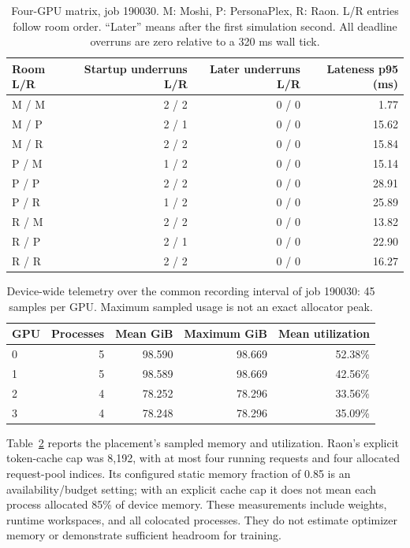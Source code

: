 \documentclass{article}
\begin{document}
\begin{table}[t]
\centering
\caption{Four-GPU matrix, job 190030. M: Moshi, P: PersonaPlex, R: Raon. L/R entries follow room order. ``Later'' means after the first simulation second. All deadline overruns are zero relative to a 320 ms wall tick.}
\label{tab:matrix}
\begin{tabular}{lrrr}\toprule
\rowcolor{MuCream} Room L/R & Startup underruns L/R & Later underruns L/R & Lateness p95 (ms)\\\midrule
M / M & 2 / 2 & 0 / 0 & 1.77\\
M / P & 2 / 1 & 0 / 0 & 15.62\\
M / R & 2 / 2 & 0 / 0 & 15.84\\
P / M & 1 / 2 & 0 / 0 & 15.14\\
P / P & 2 / 2 & 0 / 0 & 28.91\\
P / R & 1 / 2 & 0 / 0 & 25.89\\
R / M & 2 / 2 & 0 / 0 & 13.82\\
R / P & 2 / 1 & 0 / 0 & 22.90\\
R / R & 2 / 2 & 0 / 0 & 16.27\\\bottomrule
\end{tabular}
\end{table}

\begin{table}[t]
\centering
\caption{Device-wide telemetry over the common recording interval of job 190030: 45 samples per GPU. Maximum sampled usage is not an exact allocator peak.}
\label{tab:memory}
\begin{tabular}{lrrrr}\toprule
\rowcolor{MuCream} GPU & Processes & Mean GiB & Maximum GiB & Mean utilization\\\midrule
0 & 5 & 98.590 & 98.669 & 52.38\%\\
1 & 5 & 98.589 & 98.669 & 42.56\%\\
2 & 4 & 78.252 & 78.296 & 33.56\%\\
3 & 4 & 78.248 & 78.296 & 35.09\%\\\bottomrule
\end{tabular}
\end{table}

Table~\ref{tab:memory} reports the placement's sampled memory and utilization. Raon's explicit token-cache cap was 8,192, with at most four running requests and four allocated request-pool indices. Its configured static memory fraction of 0.85 is an availability/budget setting; with an explicit cache cap it does not mean each process allocated 85\% of device memory. These measurements include weights, runtime workspaces, and all colocated processes. They do not estimate optimizer memory or demonstrate sufficient headroom for training.
\end{document}
